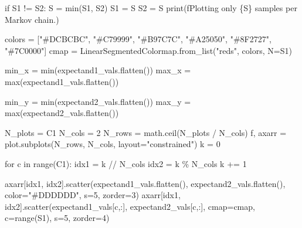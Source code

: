 \documentclass[
  letterpaper,
  DIV=11,
  numbers=noendperiod]{scrartcl}
\newenvironment{Shaded}{\begin{snugshade}}{\end{snugshade}}
\newcommand{\BuiltInTok}[1]{\textcolor[rgb]{0.00,0.23,0.31}{#1}}
\newcommand{\ControlFlowTok}[1]{\textcolor[rgb]{0.00,0.23,0.31}{#1}}
\newcommand{\DecValTok}[1]{\textcolor[rgb]{0.68,0.00,0.00}{#1}}
\newcommand{\KeywordTok}[1]{\textcolor[rgb]{0.00,0.23,0.31}{#1}}
\newcommand{\NormalTok}[1]{\textcolor[rgb]{0.00,0.23,0.31}{#1}}
\newcommand{\OperatorTok}[1]{\textcolor[rgb]{0.37,0.37,0.37}{#1}}
\newcommand{\SpecialCharTok}[1]{\textcolor[rgb]{0.37,0.37,0.37}{#1}}
\newcommand{\SpecialStringTok}[1]{\textcolor[rgb]{0.13,0.47,0.30}{#1}}
\newcommand{\StringTok}[1]{\textcolor[rgb]{0.13,0.47,0.30}{#1}}
\begin{document}
\begin{Shaded}
\begin{Highlighting}[]
  \ControlFlowTok{if}\NormalTok{ S1 }\OperatorTok{!=}\NormalTok{ S2:}
\NormalTok{    S }\OperatorTok{=} \BuiltInTok{min}\NormalTok{(S1, S2)}
\NormalTok{    S1 }\OperatorTok{=}\NormalTok{ S}
\NormalTok{    S2 }\OperatorTok{=}\NormalTok{ S}
    \BuiltInTok{print}\NormalTok{(}\SpecialStringTok{f\textquotesingle{}Plotting only }\SpecialCharTok{\{}\NormalTok{S}\SpecialCharTok{\}}\SpecialStringTok{ samples per Markov chain.\textquotesingle{}}\NormalTok{)}
  
\NormalTok{  colors }\OperatorTok{=}\NormalTok{ [}\StringTok{"\#DCBCBC"}\NormalTok{, }\StringTok{"\#C79999"}\NormalTok{, }\StringTok{"\#B97C7C"}\NormalTok{,}
            \StringTok{"\#A25050"}\NormalTok{, }\StringTok{"\#8F2727"}\NormalTok{, }\StringTok{"\#7C0000"}\NormalTok{]}
\NormalTok{  cmap }\OperatorTok{=}\NormalTok{ LinearSegmentedColormap.from\_list(}\StringTok{"reds"}\NormalTok{, colors, N}\OperatorTok{=}\NormalTok{S1)}

\NormalTok{  min\_x }\OperatorTok{=} \BuiltInTok{min}\NormalTok{(expectand1\_vals.flatten())}
\NormalTok{  max\_x }\OperatorTok{=} \BuiltInTok{max}\NormalTok{(expectand1\_vals.flatten())}
  
\NormalTok{  min\_y }\OperatorTok{=} \BuiltInTok{min}\NormalTok{(expectand2\_vals.flatten())}
\NormalTok{  max\_y }\OperatorTok{=} \BuiltInTok{max}\NormalTok{(expectand2\_vals.flatten())}
  
\NormalTok{  N\_plots }\OperatorTok{=}\NormalTok{ C1}
\NormalTok{  N\_cols }\OperatorTok{=} \DecValTok{2}
\NormalTok{  N\_rows }\OperatorTok{=}\NormalTok{ math.ceil(N\_plots }\OperatorTok{/}\NormalTok{ N\_cols)}
\NormalTok{  f, axarr }\OperatorTok{=}\NormalTok{ plot.subplots(N\_rows, N\_cols, layout}\OperatorTok{=}\StringTok{"constrained"}\NormalTok{)}
\NormalTok{  k }\OperatorTok{=} \DecValTok{0}
  
  \ControlFlowTok{for}\NormalTok{ c }\KeywordTok{in} \BuiltInTok{range}\NormalTok{(C1):}
\NormalTok{    idx1 }\OperatorTok{=}\NormalTok{ k }\OperatorTok{//}\NormalTok{ N\_cols}
\NormalTok{    idx2 }\OperatorTok{=}\NormalTok{ k }\OperatorTok{\%}\NormalTok{ N\_cols}
\NormalTok{    k }\OperatorTok{+=} \DecValTok{1}
    
\NormalTok{    axarr[idx1, idx2].scatter(expectand1\_vals.flatten(),}
\NormalTok{                              expectand2\_vals.flatten(),}
\NormalTok{                              color}\OperatorTok{=}\StringTok{"\#DDDDDD"}\NormalTok{, s}\OperatorTok{=}\DecValTok{5}\NormalTok{, zorder}\OperatorTok{=}\DecValTok{3}\NormalTok{)}
\NormalTok{    axarr[idx1, idx2].scatter(expectand1\_vals[c,:], expectand2\_vals[c,:],}
\NormalTok{                              cmap}\OperatorTok{=}\NormalTok{cmap, c}\OperatorTok{=}\BuiltInTok{range}\NormalTok{(S1), s}\OperatorTok{=}\DecValTok{5}\NormalTok{, zorder}\OperatorTok{=}\DecValTok{4}\NormalTok{)}
    

\end{Highlighting}
\end{Shaded}
\end{document}
